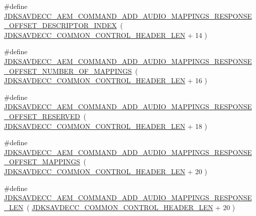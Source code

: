 \begin{DoxyCompactItemize}
\item 
\#define \hyperlink{group__command__add__audio__mappings__response_ga0dde1646e180c9485735e2fb8be51d9a}{J\+D\+K\+S\+A\+V\+D\+E\+C\+C\+\_\+\+A\+E\+M\+\_\+\+C\+O\+M\+M\+A\+N\+D\+\_\+\+A\+D\+D\+\_\+\+A\+U\+D\+I\+O\+\_\+\+M\+A\+P\+P\+I\+N\+G\+S\+\_\+\+R\+E\+S\+P\+O\+N\+S\+E\+\_\+\+O\+F\+F\+S\+E\+T\+\_\+\+D\+E\+S\+C\+R\+I\+P\+T\+O\+R\+\_\+\+I\+N\+D\+EX}~( \hyperlink{group__jdksavdecc__avtp__common__control__header_gaae84052886fb1bb42f3bc5f85b741dff}{J\+D\+K\+S\+A\+V\+D\+E\+C\+C\+\_\+\+C\+O\+M\+M\+O\+N\+\_\+\+C\+O\+N\+T\+R\+O\+L\+\_\+\+H\+E\+A\+D\+E\+R\+\_\+\+L\+EN} + 14 )
\item 
\#define \hyperlink{group__command__add__audio__mappings__response_ga7c0e56133ef6bb35d217198dd1194fbb}{J\+D\+K\+S\+A\+V\+D\+E\+C\+C\+\_\+\+A\+E\+M\+\_\+\+C\+O\+M\+M\+A\+N\+D\+\_\+\+A\+D\+D\+\_\+\+A\+U\+D\+I\+O\+\_\+\+M\+A\+P\+P\+I\+N\+G\+S\+\_\+\+R\+E\+S\+P\+O\+N\+S\+E\+\_\+\+O\+F\+F\+S\+E\+T\+\_\+\+N\+U\+M\+B\+E\+R\+\_\+\+O\+F\+\_\+\+M\+A\+P\+P\+I\+N\+GS}~( \hyperlink{group__jdksavdecc__avtp__common__control__header_gaae84052886fb1bb42f3bc5f85b741dff}{J\+D\+K\+S\+A\+V\+D\+E\+C\+C\+\_\+\+C\+O\+M\+M\+O\+N\+\_\+\+C\+O\+N\+T\+R\+O\+L\+\_\+\+H\+E\+A\+D\+E\+R\+\_\+\+L\+EN} + 16 )
\item 
\#define \hyperlink{group__command__add__audio__mappings__response_ga65bda6ee1860d9465f2e514fd55d0490}{J\+D\+K\+S\+A\+V\+D\+E\+C\+C\+\_\+\+A\+E\+M\+\_\+\+C\+O\+M\+M\+A\+N\+D\+\_\+\+A\+D\+D\+\_\+\+A\+U\+D\+I\+O\+\_\+\+M\+A\+P\+P\+I\+N\+G\+S\+\_\+\+R\+E\+S\+P\+O\+N\+S\+E\+\_\+\+O\+F\+F\+S\+E\+T\+\_\+\+R\+E\+S\+E\+R\+V\+ED}~( \hyperlink{group__jdksavdecc__avtp__common__control__header_gaae84052886fb1bb42f3bc5f85b741dff}{J\+D\+K\+S\+A\+V\+D\+E\+C\+C\+\_\+\+C\+O\+M\+M\+O\+N\+\_\+\+C\+O\+N\+T\+R\+O\+L\+\_\+\+H\+E\+A\+D\+E\+R\+\_\+\+L\+EN} + 18 )
\item 
\#define \hyperlink{group__command__add__audio__mappings__response_gafbc13940199d2f419ac8fed06450422c}{J\+D\+K\+S\+A\+V\+D\+E\+C\+C\+\_\+\+A\+E\+M\+\_\+\+C\+O\+M\+M\+A\+N\+D\+\_\+\+A\+D\+D\+\_\+\+A\+U\+D\+I\+O\+\_\+\+M\+A\+P\+P\+I\+N\+G\+S\+\_\+\+R\+E\+S\+P\+O\+N\+S\+E\+\_\+\+O\+F\+F\+S\+E\+T\+\_\+\+M\+A\+P\+P\+I\+N\+GS}~( \hyperlink{group__jdksavdecc__avtp__common__control__header_gaae84052886fb1bb42f3bc5f85b741dff}{J\+D\+K\+S\+A\+V\+D\+E\+C\+C\+\_\+\+C\+O\+M\+M\+O\+N\+\_\+\+C\+O\+N\+T\+R\+O\+L\+\_\+\+H\+E\+A\+D\+E\+R\+\_\+\+L\+EN} + 20 )
\item 
\#define \hyperlink{group__command__add__audio__mappings__response_ga2cef1e4c1cdc7e8b6573a4427913f5de}{J\+D\+K\+S\+A\+V\+D\+E\+C\+C\+\_\+\+A\+E\+M\+\_\+\+C\+O\+M\+M\+A\+N\+D\+\_\+\+A\+D\+D\+\_\+\+A\+U\+D\+I\+O\+\_\+\+M\+A\+P\+P\+I\+N\+G\+S\+\_\+\+R\+E\+S\+P\+O\+N\+S\+E\+\_\+\+L\+EN}~( \hyperlink{group__jdksavdecc__avtp__common__control__header_gaae84052886fb1bb42f3bc5f85b741dff}{J\+D\+K\+S\+A\+V\+D\+E\+C\+C\+\_\+\+C\+O\+M\+M\+O\+N\+\_\+\+C\+O\+N\+T\+R\+O\+L\+\_\+\+H\+E\+A\+D\+E\+R\+\_\+\+L\+EN} + 20 )
\end{DoxyCompactItemize}
